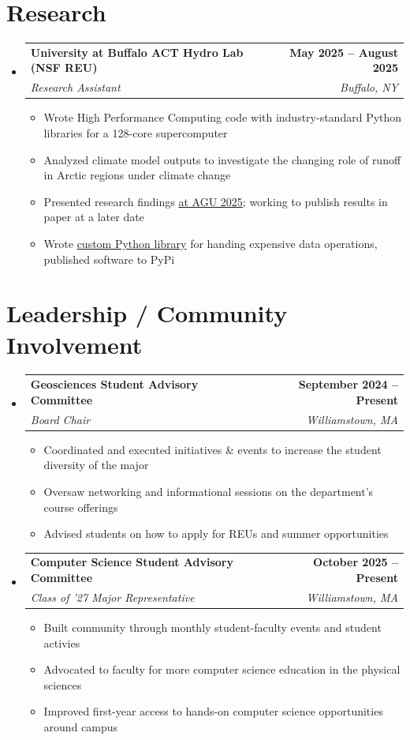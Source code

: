 \documentclass[letterpaper, 11pt]{article}
\makeatletter
\newcommand{\resumeItem}[1]{ \item\small{ {#1 \vspace{-2pt}} } }
\newcommand{\resumeSubheading}[4]{
\vspace{-2pt}
\item
\begin{tabular*}{1.0\textwidth}[t]{l@{\extracolsep{\fill}}r}
	\textbf{#1}       & \textbf{\small #2} \\
	\textit{\small#3} & \textit{\small #4} \\
\end{tabular*}
\vspace{-8pt}
}
\newcommand{\resumeSubHeadingListStart}{\begin{itemize}[leftmargin=0.0in, label={}]}
\newcommand{\resumeSubHeadingListEnd}{\end{itemize}}
\newcommand{\resumeItemListStart}{\vspace{-6pt}\begin{itemize}}
\newcommand{\resumeItemListEnd}{\end{itemize}
\vspace{-6pt}}
\makeatother
\begin{document}
	\section{Research}
	\resumeSubHeadingListStart

        \resumeSubheading {University at Buffalo ACT Hydro Lab (NSF REU)}{May 2025 -- August 2025} {Research Assistant}{Buffalo, NY}
	\resumeItemListStart
        \resumeItem{Wrote High Performance Computing code with industry-standard Python libraries for a 128-core supercomputer}
	\resumeItem{Analyzed climate model outputs to investigate the changing role of runoff in Arctic regions under climate change}
	\resumeItem{Presented research findings \href{https://agu.confex.com/agu/agu25/meetingapp.cgi/Paper/1874057}{at AGU 2025}; working to publish results in paper at a later date}
        \resumeItem{Wrote \href{https://github.com/nsflores1/zeitcache}{custom Python library} for handing expensive data operations, published software to PyPi}
	\resumeItemListEnd
       
	\resumeSubHeadingListEnd

	\section{Leadership / Community Involvement}
	\resumeSubHeadingListStart
        
        \resumeSubheading {Geosciences Student Advisory Committee}{September 2024 -- Present}
	{Board Chair}{Williamstown, MA}
        \resumeItemListStart
	\resumeItem{Coordinated and executed initiatives \& events to increase the student diversity of the major}
	\resumeItem{Oversaw networking and informational sessions on the department's course offerings}
        \resumeItem{Advised students on how to apply for REUs and summer opportunities}
	\resumeItemListEnd

        \resumeSubheading {Computer Science Student Advisory Committee}{October 2025 -- Present}
	{Class of '27 Major Representative}{Williamstown, MA}
        \resumeItemListStart
	\resumeItem{Built community through monthly student-faculty events and student activies}
        \resumeItem{Advocated to faculty for more computer science education in the physical sciences}
        \resumeItem{Improved first-year access to hands-on computer science opportunities around campus}
	\resumeItemListEnd

	\resumeSubHeadingListEnd
\end{document}
